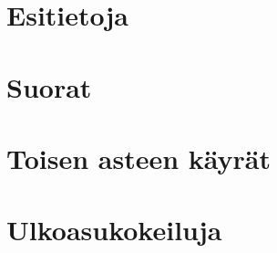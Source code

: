\chapter{Esitietoja}
	
	
	
	

\chapter{Suorat}
	
	
	
	

\chapter{Toisen asteen käyrät}
	
	
	
	
	
	
	

\chapter{Ulkoasukokeiluja}
	
